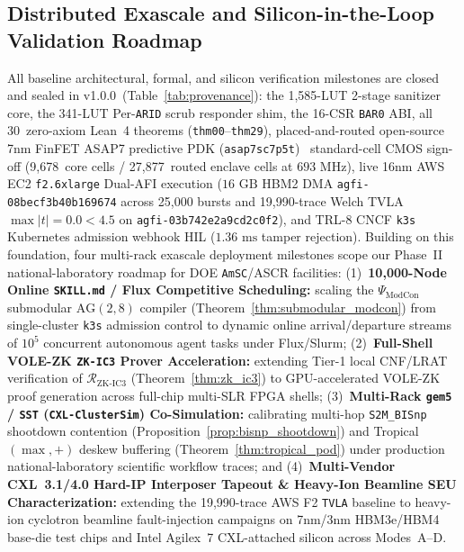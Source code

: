 \documentclass[10pt,twocolumn]{article}
\providecommand{\ReleaseVersion}{v1.0.0}
\providecommand{\LeanTheoremTotal}{30}
\providecommand{\CoreClbLuts}{1,585}
\providecommand{\ScrubShimLuts}{341}
\providecommand{\AwsAgfiId}{agfi-03b742e2a9cd2c0f2}
\providecommand{\AwsHbmAgfiId}{agfi-08becf3b40b169674}
\providecommand{\AwsLiveBursts}{25,000}
\providecommand{\AsicCoreCells}{9,678}
\providecommand{\AsicStandardCells}{27,877}
\providecommand{\AsicFmaxMhz}{\ensuremath{693\text{~MHz}}}
\providecommand{\CorePhysicalLUTs}{\CoreClbLuts}
\providecommand{\ScrubShimPhysicalLUTs}{\ScrubShimLuts}
\theoremstyle{spectralthm}
\begin{document}
\subsection{Distributed Exascale and Silicon-in-the-Loop Validation Roadmap}
\label{sec:roadmap}
All baseline architectural, formal, and silicon verification milestones are closed and sealed in \ReleaseVersion\ (Table~\ref{tab:provenance}): the \CorePhysicalLUTs-LUT 2-stage sanitizer core, the \ScrubShimPhysicalLUTs-LUT Per-\texttt{ARID} scrub responder shim, the 16-CSR \texttt{BAR0} ABI, all \LeanTheoremTotal\ zero-axiom Lean~4 theorems (\texttt{thm00}--\texttt{thm29}), placed-and-routed open-source 7nm FinFET ASAP7 predictive PDK (\texttt{asap7sc7p5t})~\cite{clark2016asap7} standard-cell CMOS sign-off (\AsicCoreCells\ core cells / \AsicStandardCells\ routed enclave cells at \AsicFmaxMhz), live 16nm AWS EC2 \texttt{f2.6xlarge} Dual-AFI execution ($16\text{~GB}$ HBM2 DMA \texttt{\AwsHbmAgfiId} across \AwsLiveBursts{} bursts and 19,990-trace Welch TVLA $\max|t|=0.0 < 4.5$ on \texttt{\AwsAgfiId}), and TRL-8 CNCF \texttt{k3s} Kubernetes admission webhook HIL ($1.36\text{~ms}$ tamper rejection). Building on this foundation, four multi-rack exascale deployment milestones scope our Phase~II national-laboratory roadmap for DOE \texttt{AmSC}/ASCR facilities: (1)~\textbf{10,000-Node Online \texttt{SKILL.md} / Flux Competitive Scheduling:} scaling the $\Psi_{\mathrm{ModCon}}$ submodular $\mathrm{AG}(2,8)$ compiler (Theorem~\ref{thm:submodular_modcon}) from single-cluster \texttt{k3s} admission control to dynamic online arrival/departure streams of $10^5$ concurrent autonomous agent tasks under Flux/Slurm; (2)~\textbf{Full-Shell VOLE-ZK \texttt{ZK-IC3} Prover Acceleration:} extending Tier-1 local CNF/LRAT verification of $\mathcal{R}_{\mathrm{ZK\text{-}IC3}}$ (Theorem~\ref{thm:zk_ic3}) to GPU-accelerated VOLE-ZK proof generation across full-chip multi-SLR FPGA shells; (3)~\textbf{Multi-Rack \texttt{gem5} / \texttt{SST} (\texttt{CXL-ClusterSim}) Co-Simulation:} calibrating multi-hop \texttt{S2M\_BISnp} shootdown contention (Proposition~\ref{prop:bisnp_shootdown}) and Tropical $(\max,+)$ deskew buffering (Theorem~\ref{thm:tropical_pod}) under production national-laboratory scientific workflow traces; and (4)~\textbf{Multi-Vendor CXL~3.1/4.0 Hard-IP Interposer Tapeout \& Heavy-Ion Beamline SEU Characterization:} extending the 19,990-trace AWS F2 \texttt{TVLA} baseline to heavy-ion cyclotron beamline fault-injection campaigns on 7nm/3nm HBM3e/HBM4 base-die test chips and Intel Agilex~7 CXL-attached silicon across Modes~A--D.
\end{document}
